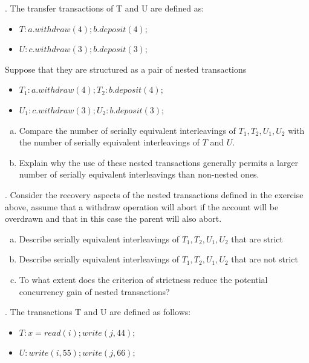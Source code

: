 \documentclass[12pt]{article}
\newcounter{question}
\newcommand{\question}[1]{
    \stepcounter{question}
    \thequestion. #1 \hfill
}
\begin{document}
\bigskip

\question{The transfer transactions of T and U are defined as:}

\begin{itemize}
    \item $T: a.withdraw(4); b.deposit(4);$
    \item $U: c.withdraw(3); b.deposit(3);$
\end{itemize}

Suppose that they are structured as a pair of nested transactions

\begin{itemize}
    \item $T_1: a.withdraw(4); T_2: b.deposit(4);$
    \item $U_1: c.withdraw(3); U_2: b.deposit(3);$
\end{itemize}

\begin{enumerate}[(a)]
    \item Compare the number of serially equivalent interleavings of $T_1,T_2,U_1,U_2$ with the number of serially equivalent interleavings of $T$ and $U$.
    \item Explain why the use of these nested transactions generally permits a larger number of serially equivalent interleavings than non-nested ones.
\end{enumerate}

\bigskip

\question{Consider the recovery aspects of the nested transactions defined in the exercise above, assume that a withdraw operation will abort if the account will be overdrawn and that in this case the parent will also abort. }

\begin{enumerate}[(a)]
    \item Describe serially equivalent interleavings of $T_1, T_2, U_1, U_2$ that are strict
    \item Describe serially equivalent interleavings of $T_1, T_2, U_1, U_2$ that are not strict
    \item To what extent does the criterion of strictness reduce the potential concurrency gain of nested transactions?
\end{enumerate}

\question{The transactions T and U are defined as follows:}

\begin{itemize}
    \item $T: x = read(i); write(j, 44);$
    \item $U: write(i,55); write(j, 66);$
\end{itemize}
\end{document}
